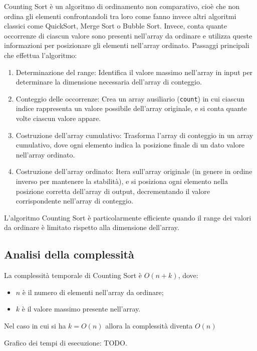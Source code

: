 \documentclass[a4paper, 12pt, oneside]{book}
\begin{document}
Counting Sort è un algoritmo di ordinamento non comparativo, cioè che non ordina gli elementi confrontandoli tra loro come fanno invece altri algoritmi classici come QuickSort, Merge Sort o Bubble Sort.
Invece, conta quante occorrenze di ciascun valore sono presenti nell'array da ordinare e utilizza queste informazioni per posizionare gli elementi nell'array ordinato. Passaggi principali che effettua l'algoritmo:

\begin{enumerate}
    \item Determinazione del range: Identifica il valore massimo nell'array in input per determinare la dimensione necessaria dell'array di conteggio.
    \item Conteggio delle occorrenze: Crea un array ausiliario (\texttt{count}) in cui ciascun indice rappresenta un valore possibile dell'array originale, e si conta quante volte ciascun valore appare.
    \item Costruzione dell'array cumulativo: Trasforma l'array di conteggio in un array cumulativo, dove ogni elemento indica la posizione finale di un dato valore nell'array ordinato.
    \item Costruzione dell'array ordinato: Itera sull'array originale (in genere in ordine inverso per mantenere la stabilità), e si posiziona ogni elemento nella posizione corretta dell'array di output, decrementando il valore corrispondente nell'array di conteggio.
\end{enumerate}

\noindent L'algoritmo Counting Sort è particolarmente efficiente quando il range dei valori da ordinare è limitato rispetto alla dimensione dell'array.

\subsection*{Analisi della complessità}

La complessità temporale di Counting Sort è \(O(n + k)\), dove:

\begin{itemize}
    \item \(n\) è il numero di elementi nell'array da ordinare;
    \item \(k\) è il valore massimo presente nell'array.
\end{itemize}

\noindent Nel caso in cui si ha \(k=O(n)\) allora la complessità diventa \(O(n)\)

Grafico dei tempi di esecuzione: TODO.
\end{document}
